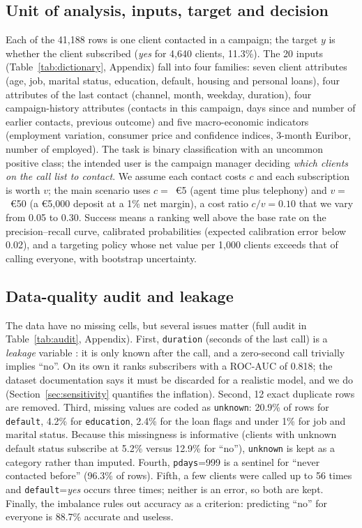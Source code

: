 \documentclass[conference]{IEEEtran}
\begin{document}
\subsection{Unit of analysis, inputs, target and decision}
Each of the 41,188 rows is one client contacted in a campaign; the target $y$ is whether the client subscribed (\emph{yes} for 4,640 clients, 11.3\%). The 20 inputs (Table~\ref{tab:dictionary}, Appendix) fall into four families: seven client attributes (age, job, marital status, education, default, housing and personal loans), four attributes of the last contact (channel, month, weekday, duration), four campaign-history attributes (contacts in this campaign, days since and number of earlier contacts, previous outcome) and five macro-economic indicators (employment variation, consumer price and confidence indices, 3-month Euribor, number of employed). The task is binary classification with an uncommon positive class; the intended user is the campaign manager deciding \emph{which clients on the call list to contact}. We assume each contact costs $c$ and each subscription is worth $v$; the main scenario uses $c=$~\euro5 (agent time plus telephony) and $v=$~\euro50 (a \euro5,000 deposit at a 1\% net margin), a cost ratio $c/v=0.10$ that we vary from 0.05 to 0.30. Success means a ranking well above the base rate on the precision--recall curve, calibrated probabilities (expected calibration error below 0.02), and a targeting policy whose net value per 1,000 clients exceeds that of calling everyone, with bootstrap uncertainty.

\subsection{Data-quality audit and leakage}
The data have no missing cells, but several issues matter (full audit in Table~\ref{tab:audit}, Appendix). First, \texttt{duration} (seconds of the last call) is a \emph{leakage} variable \cite{kaufman2012}: it is only known after the call, and a zero-second call trivially implies ``no''. On its own it ranks subscribers with a ROC-AUC of 0.818; the dataset documentation says it must be discarded for a realistic model, and we do (Section~\ref{sec:sensitivity} quantifies the inflation). Second, 12 exact duplicate rows are removed. Third, missing values are coded as \texttt{unknown}: 20.9\% of rows for \texttt{default}, 4.2\% for \texttt{education}, 2.4\% for the loan flags and under 1\% for job and marital status. Because this missingness is informative (clients with unknown default status subscribe at 5.2\% versus 12.9\% for ``no''), \texttt{unknown} is kept as a category rather than imputed. Fourth, \texttt{pdays}=999 is a sentinel for ``never contacted before'' (96.3\% of rows). Fifth, a few clients were called up to 56 times and \texttt{default}=\emph{yes} occurs three times; neither is an error, so both are kept. Finally, the imbalance rules out accuracy as a criterion: predicting ``no'' for everyone is 88.7\% accurate and useless.
\end{document}
